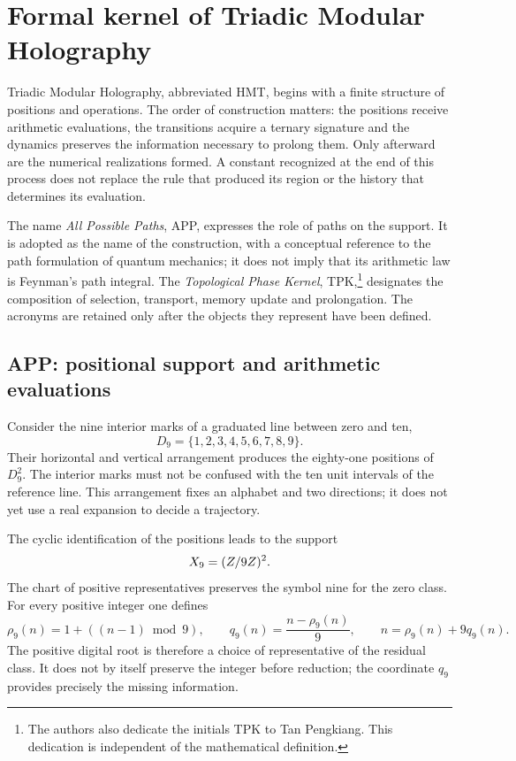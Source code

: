 \section{Formal kernel of Triadic Modular Holography}
\label{x_reciprocidad:sec:nucleo}

Triadic Modular Holography, abbreviated HMT, begins with a finite structure of positions and operations. The order of construction matters: the positions receive arithmetic evaluations, the transitions acquire a ternary signature and the dynamics preserves the information necessary to prolong them. Only afterward are the numerical realizations formed. A constant recognized at the end of this process does not replace the rule that produced its region or the history that determines its evaluation.

The name \emph{All Possible Paths}, APP, expresses the role of paths on the support. It is adopted as the name of the construction, with a conceptual reference to the path formulation of quantum mechanics; it does not imply that its arithmetic law is Feynman's path integral. The \emph{Topological Phase Kernel}, TPK,\footnote{The authors also dedicate the initials TPK to Tan Pengkiang. This dedication is independent of the mathematical definition.} designates the composition of selection, transport, memory update and prolongation. The acronyms are retained only after the objects they represent have been defined.

\subsection{APP: positional support and arithmetic evaluations}

Consider the nine interior marks of a graduated line between zero and ten,
\[
 D_9=\{1,2,3,4,5,6,7,8,9\}.
\]
Their horizontal and vertical arrangement produces the eighty-one positions of \(D_9^2\). The interior marks must not be confused with the ten unit intervals of the reference line. This arrangement fixes an alphabet and two directions; it does not yet use a real expansion to decide a trajectory.

The cyclic identification of the positions leads to the support
\[
 X_9=(Z/9Z)^2.
\]
The chart of positive representatives preserves the symbol nine for the zero class. For every positive integer one defines
\begin{equation}
 \rho_9(n)=1+((n-1)\bmod9),\qquad
 q_9(n)=\frac{n-\rho_9(n)}9,
 \qquad n=\rho_9(n)+9q_9(n).
 \label{x_reciprocidad:eq:residuo-cociente}
\end{equation}
The positive digital root is therefore a choice of representative of the residual class. It does not by itself preserve the integer before reduction; the coordinate \(q_9\) provides precisely the missing information.

